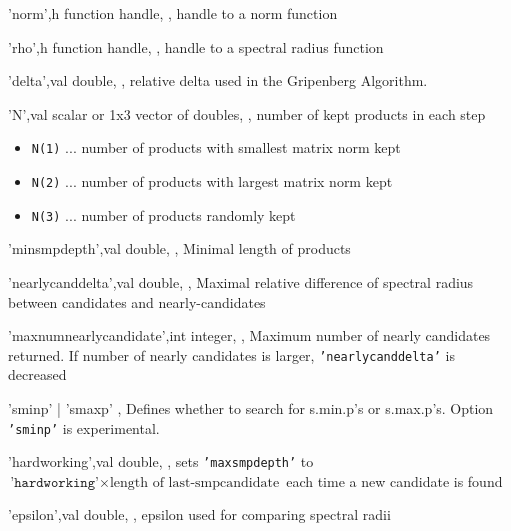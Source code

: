 \begin{param}
\item['norm',h]           function handle, , handle to a norm function
\item['rho',h]			  function handle, , handle to a spectral radius function               
\item['delta',val]        double, , relative delta used in the Gripenberg Algorithm.
\item['N',val]            scalar or 1x3 vector of doubles, , number of kept products in each step
                                          \begin{itemize}
                                          \item \texttt{N(1)}  ... number of products with smallest matrix norm kept
                                          \item \texttt{N(2)}  ... number of products with largest matrix norm kept
                                          \item \texttt{N(3)}  ... number of products randomly kept
                                          \end{itemize}
\item['minsmpdepth',val]               double, , Minimal length of products
\item['nearlycanddelta',val]           double, , Maximal relative difference of spectral radius between candidates and nearly-candidates
\item['maxnumnearlycandidate',int]     integer, , Maximum number of nearly candidates returned. 
If number of nearly candidates is larger, \texttt{'nearlycanddelta'} is decreased

\item['sminp' | 'smaxp']               , Defines whether to search for s.min.p's or s.max.p's.
Option \texttt{'sminp'} is experimental.
\item['hardworking',val]               double, , sets \texttt{'maxsmpdepth'} to $\texttt{'hardworking'} \times \text{length of last-smpcandidate}$
 each time a new candidate is found
\item['epsilon',val]                   double, , epsilon used for comparing spectral radii
\end{param}

